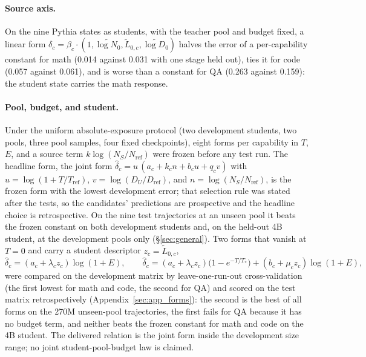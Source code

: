 \paragraph{Source axis.} On the nine Pythia states as students, with
the teacher pool and budget fixed, a linear form
$\delta_c=\beta_c\cdot(1,\tilde{\log N_0},\tilde L_{0,c},\tilde{\log D_0})$
halves the error of a per-capability constant for math (0.014 against
0.031 with one stage held out), ties it for code (0.057 against
0.061), and is worse than a constant for QA (0.263 against 0.159):
the student state carries the math response.

\paragraph{Pool, budget, and student.} Under the uniform
absolute-exposure protocol (two development students, two pools,
three pool samples, four fixed checkpoints), eight forms per
capability in $T$, $E$, and a source term $k\log(N_S/N_{\mathrm{ref}})$
were frozen before any test run. The headline form, the joint form
$\widehat\delta_c=u\,(a_c+k_c n+b_c u+q_c v)$ with
$u=\log(1+T/T_{\mathrm{ref}})$, $v=\log(D_U/D_{\mathrm{ref}})$, and
$n=\log(N_S/N_{\mathrm{ref}})$, is the frozen form with the lowest
development error; that selection rule was stated after the tests, so
the candidates' predictions are prospective and the headline choice is
retrospective. On the nine test trajectories at an unseen pool it
beats the frozen constant on both development students and, on the
held-out 4B student, at the development pools only
(\S\ref{sec:general}). Two forms that vanish at $T=0$ and carry a
student descriptor $z_c=\tilde L_{0,c}$,
\begin{equation}
\widehat\delta_c=(a_c+\lambda_c z_c)\log(1+E),\qquad
\widehat\delta_c=(a_c+\lambda_c z_c)\big(1-e^{-T/T_*}\big)+(b_c+\mu_c z_c)\log(1+E),
\label{eq:kdforms}
\end{equation}
were compared on the development matrix by leave-one-run-out
cross-validation (the first lowest for math and code, the second for
QA) and scored on the test matrix retrospectively
(Appendix~\ref{sec:app_forms}): the second is the best of all forms on
the 270M unseen-pool trajectories, the first fails for QA because it
has no budget term, and neither beats the frozen constant for math
and code on the 4B student. The delivered relation is the joint form
inside the development size range; no joint student-pool-budget law
is claimed.
